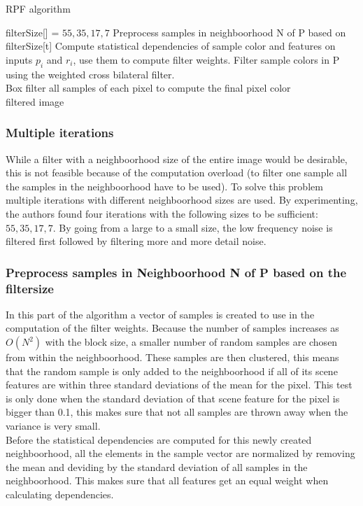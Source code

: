 \begin{algorithm}
  \caption{RPF algorithm}
  \label{algo:RPF}
  \begin{algorithmic}
    \State filterSize[] = ${55,35,17,7}$
	 \State Preprocess samples in neighboorhood N of P based on 
	 \State filterSize[t]
	 \State Compute statistical dependencies of sample color and 
	 \State features on inputs $p_i$ and $r_i$, use them to compute filter 
	 \State weights.
	 \State Filter sample colors in P using the weighted cross 
	 \State bilateral filter.
      \EndFor
    \EndFor \\
    Box filter all samples of each pixel to compute the final pixel color \\
    \Return filtered image
  \end{algorithmic}
\end{algorithm}

\subsubsection{Multiple iterations}
While a filter with a neighboorhood size of the entire image would be desirable, this is not feasible because of the computation overload 
(to filter one sample all the samples in the neighboorhood have to be used).
To solve this problem multiple iterations with different neighboorhood sizes are used.
By experimenting, the authors found four iterations with the following sizes to be sufficient: ${55,35,17,7}$.
By going from a large to a small size, the low frequency noise is filtered first followed by filtering more and more detail noise.

\subsubsection{Preprocess samples in Neighboorhood N of P based on the filtersize}
In this part of the algorithm a vector of samples is created to use in the computation of the filter weights.
Because the number of samples increases as $O(N^2)$ with the block size, a smaller number of random samples are chosen from within the neighboorhood.
These samples are then clustered, this means that the random sample is only added to the neighboorhood if all of its scene features are within three standard deviations of the mean for the pixel.
This test is only done when the standard deviation of that scene feature for the pixel is bigger than 0.1, this makes sure that not all samples are thrown away when the variance is very small.
\\
Before the statistical dependencies are computed for this newly created neighboorhood, all the elements in the sample vector are normalized by removing the mean and deviding by the standard deviation of all samples in the neighboorhood.
This makes sure that all features get an equal weight when calculating dependencies.

